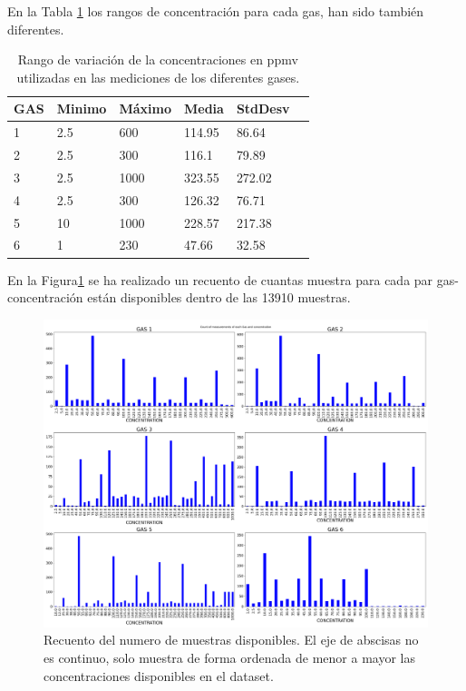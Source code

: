 En la Tabla \ref{Tab:Variación de las concentraciones} los rangos de concentración para cada gas, han sido también diferentes.

\begin{table}
    \centering
    \begin{tabular}{|l|l|l|l|l|l|}
    \toprule
    GAS & Minimo & Máximo & Media  & StdDesv \\ \midrule
        1 & 2.5 & 600    & 114.95 & 86.64          \\ \hline
        2 & 2.5 & 300    & 116.1  & 79.89          \\ \hline
        3 & 2.5 & 1000   & 323.55 & 272.02         \\ \hline
        4 & 2.5 & 300    & 126.32 & 76.71          \\ \hline
        5 & 10  & 1000   & 228.57 & 217.38         \\ \hline
        6 & 1   & 230    & 47.66  & 32.58          \\ \bottomrule
    \end{tabular}
	\caption{ Rango de variación de la concentraciones en ppmv utilizadas en las mediciones de los diferentes gases. \label{Tab:Variación de las concentraciones}}
\end{table}

En la Figura\ref{fig:step0concentration-distribution-per-gas} se ha realizado un recuento de cuantas muestra para cada par gas-concentración están disponibles dentro de las 13910 muestras.

\begin{figure}
	\centering
	\includegraphics[width=\linewidth]{"../py_imgs/Step0_Concentration Distribution per gas"}
	\caption{ Recuento del numero de muestras disponibles. El eje de abscisas no es continuo, solo muestra de forma ordenada de menor a mayor las concentraciones disponibles en el dataset. }
	\label{fig:step0concentration-distribution-per-gas}
\end{figure}

